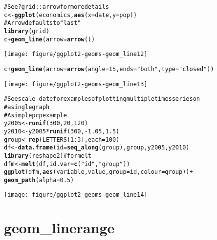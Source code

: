 \documentclass[a4paper,titlepage]{tufte-handout}\usepackage{graphicx, color}
\makeatletter
\def\maxwidth{ %
  \ifdim\Gin@nat@width>\linewidth
    \linewidth
  \else
    \Gin@nat@width
  \fi
}
\newcommand{\hlfunctioncall}[1]{\textcolor[rgb]{0.501960784313725,0,0.329411764705882}{\textbf{#1}}}%
\newcommand{\hlstring}[1]{\textcolor[rgb]{0.6,0.6,1}{#1}}%
\newcommand{\hlcomment}[1]{\textcolor[rgb]{0.180392156862745,0.6,0.341176470588235}{#1}}%
\newenvironment{kframe}{%
 \def\at@end@of@kframe{}%
 \ifinner\ifhmode%
  \def\at@end@of@kframe{\end{minipage}}%
  \begin{minipage}{\columnwidth}%
 \fi\fi%
 \def\FrameCommand##1{\hskip\@totalleftmargin \hskip-\fboxsep
 \colorbox{shadecolor}{##1}\hskip-\fboxsep
     \hskip-\linewidth \hskip-\@totalleftmargin \hskip\columnwidth}%
 \MakeFramed {\advance\hsize-\width
   \@totalleftmargin\z@ \linewidth\hsize
   \@setminipage}}%
 {\par\unskip\endMakeFramed%
 \at@end@of@kframe}
\newenvironment{knitrout}{}{} %
\makeatother
\begin{document}
\begin{knitrout}
\begin{kframe}
\begin{alltt}
\hlcomment{# See ?grid::arrow for more details}
c <- \hlfunctioncall{ggplot}(economics, \hlfunctioncall{aes}(x = date, y = pop))
# Arrow defaults to \hlstring{"last"}
\hlfunctioncall{library}(grid)
c + \hlfunctioncall{geom_line}(arrow = \hlfunctioncall{arrow}())
\end{alltt}
\end{kframe}\texttt{[image: figure/ggplot2-geoms-geom\_line12]} \begin{kframe}\begin{alltt}
c + \hlfunctioncall{geom_line}(arrow = \hlfunctioncall{arrow}(angle = 15, ends = \hlstring{"both"}, type = \hlstring{"closed"}))
\end{alltt}
\end{kframe}\texttt{[image: figure/ggplot2-geoms-geom\_line13]} \begin{kframe}\begin{alltt}
\hlcomment{# See scale_date for examples of plotting multiple times series on}
\hlcomment{# a single graph}
\hlcomment{# A simple pcp example}
y2005 <- \hlfunctioncall{runif}(300, 20, 120)
y2010 <- y2005 * \hlfunctioncall{runif}(300, -1.05, 1.5)
group <- \hlfunctioncall{rep}(LETTERS[1:3], each = 100)
df <- \hlfunctioncall{data.frame}(id = \hlfunctioncall{seq_along}(group), group, y2005, y2010)
\hlfunctioncall{library}(reshape2) \hlcomment{# for melt}
dfm <- \hlfunctioncall{melt}(df, id.var = \hlfunctioncall{c}(\hlstring{"id"}, \hlstring{"group"}))
\hlfunctioncall{ggplot}(dfm, \hlfunctioncall{aes}(variable, value, group = id, colour = group)) +
  \hlfunctioncall{geom_path}(alpha = 0.5)
\end{alltt}
\end{kframe}\texttt{[image: figure/ggplot2-geoms-geom\_line14]} 
\end{knitrout}


\section{geom\_linerange}
\end{document}
